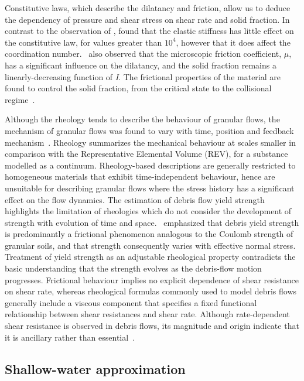 Constitutive laws, which describe the dilatancy and friction, allow us to 
deduce the dependency of pressure and shear stress on shear rate and solid 
fraction. In contrast to the observation of \citet{Campbell2002}, 
\citet{DaCruz2005} found that the elastic stiffness has little effect on the 
constitutive law, for values greater than $10^{4}$, however that it does affect 
the coordination number.~\citet{DaCruz2005} also observed that the microscopic 
friction coefficient, $\mu$, has a significant influence on the dilatancy, and 
the solid fraction remains a linearly-decreasing function of \textit{I}. The 
frictional properties of the material are found to control the solid fraction, 
from the critical state to the collisional regime~\citep{DaCruz2005}. 

Although the rheology tends to describe the behaviour of granular flows, the 
mechanism of granular flows was found to vary with time, position and feedback 
mechanism~\citep{Iverson2003}. Rheology summarizes the mechanical behaviour at 
scales smaller in comparison with the Representative Elemental Volume (REV), 
for a substance modelled as a continuum. Rheology-based descriptions are 
generally restricted to homogeneous materials that exhibit time-independent 
behaviour, hence are unsuitable for describing granular flows where the stress 
history has a significant effect on the flow dynamics. The estimation of debris 
flow yield strength highlights the limitation of rheologies which do not 
consider the development of strength with evolution of time and 
space.~\citet{Johnson1965} emphasized that debris yield strength is 
predominantly a frictional phenomenon analogous to the Coulomb strength of 
granular soils, and that strength consequently varies with effective normal 
stress. Treatment of yield strength as an adjustable rheological property 
contradicts the basic understanding that the strength evolves as the 
debris-flow motion progresses. Frictional behaviour implies no explicit 
dependence of shear resistance on shear rate, whereas rheological formulas 
commonly used to model debris flows generally include a viscous component that 
specifies a fixed functional relationship between shear resistances and shear 
rate. Although rate-dependent shear resistance is observed in debris flows, its 
magnitude and origin indicate that it is ancillary rather than 
essential~\citep{Iverson2003}.

\subsection{Shallow-water approximation}

